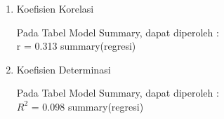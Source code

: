 \begin{enumerate}
\begin{test}
{\begin{enumerate}
    \item[-] Kesimpulan \\
    Pada taraf signifikansi 5\%, $H_0$ ditolak untuk koefisien parameter $\beta_0$, $\beta_1$ dan $\beta_2$ yang tak nol sehingga variabel X berpengaruh signifikan terhadap variabel Y
\end{enumerate}
}
summary(regresi)
\end{test}

\item Koefisien Korelasi \\
\begin{test}{
    Pada Tabel Model Summary, dapat diperoleh : \\
    r = 0.313
}
summary(regresi)
\end{test}

\item Koefisien Determinasi \\
\begin{test}{
    Pada Tabel Model Summary, dapat diperoleh : \\
    $R^2$ = 0.098
}
summary(regresi)
\end{test}

\end{enumerate}
